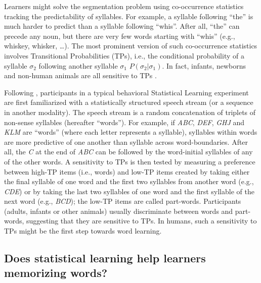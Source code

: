 \documentclass[
]{article}
\begin{document}
Learners might solve the segmentation problem using co-occurrence
statistics tracking the predictability of syllables. For example, a
syllable following ``the'' is much harder to predict than a syllable
following ``whis''. After all, ``the'' can precede any noun, but there
are very few words starting with ``whis'' (e.g., whiskey, whisker,
\ldots). The most prominent version of such co-occurrence statistics
involves Transitional Probabilities (TPs), i.e., the conditional
probability of a syllable \(\sigma_2\) following another syllable
\(\sigma_1\) \(P(\sigma_2|\sigma_1)\). In fact, infants, newborns and
non-human animals are all sensitive to TPs
\citep{Aslin1998, Chen2015, Creel2004, Endress-tone-tps, Endress-Action-Axc, Fiser2002a, Fiser2005, Flo2022, Glicksohn2011, Hauser2001, Kirkham2002, Saffran1996b, Saffran-Science, Saffran1999, Saffran2001, Sohail2016, Toro2005-backward, Turk-Browne2005, Turk-Browne-reversal}.

Following \citep{Aslin1998, Saffran-Science, Saffran1996b}, participants
in a typical behavioral Statistical Learning experiment are first
familiarized with a statistically structured speech stream (or a
sequence in another modality). The speech stream is a random
concatenation of triplets of non-sense syllables (hereafter ``words'').
For example, if \emph{ABC}, \emph{DEF}, \emph{GHJ} and \emph{KLM} are
``words'' (where each letter represents a syllable), syllables within
words are more predictive of one another than syllable across
word-boundaries. After all, the \emph{C} at the end of \emph{ABC} can be
followed by the word-initial syllables of any of the other words. A
sensitivity to TPs is then tested by measuring a preference between
high-TP items (i.e., words) and low-TP items created by taking either
the final syllable of one word and the first two syllables from another
word (e.g., \emph{CDE}) or by taking the last two syllables of one word
and the first syllable of the next word (e.g., \emph{BCD}); the low-TP
items are called part-words. Participants (adults, infants or other
animals) usually discriminate between words and part-words, suggesting
that they are sensitive to TPs. In humans, such a sensitivity to TPs
might be the first step towards word learning.

\hypertarget{does-statistical-learning-help-learners-memorizing-words}{%
\subsection{Does statistical learning help learners memorizing
words?}\label{does-statistical-learning-help-learners-memorizing-words}}
\end{document}

